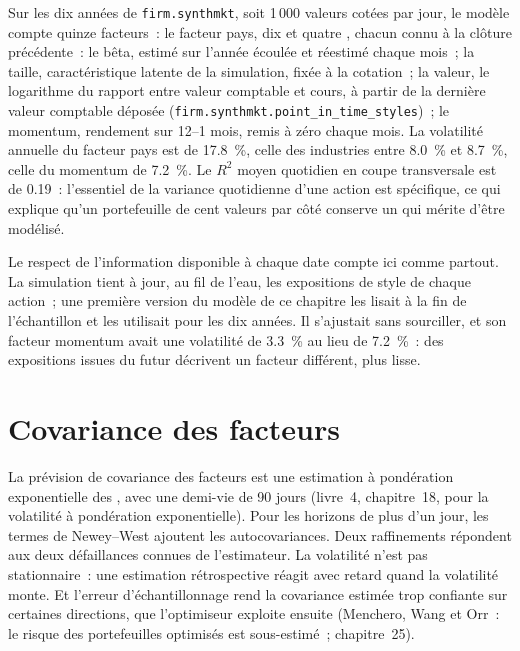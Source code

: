 Sur les dix années de \texttt{firm.synthmkt}, soit 1\,000 valeurs cotées par jour, le modèle compte quinze facteurs~: le facteur pays, dix  et quatre , chacun connu à
la clôture précédente~: le bêta, estimé sur l'année écoulée et réestimé chaque mois~; la taille, caractéristique latente de la simulation, fixée à la cotation~; la valeur,
le logarithme du rapport entre valeur comptable et cours, à partir de la dernière valeur comptable déposée (\texttt{firm.synthmkt.point\_in\_time\_styles})~; le momentum, rendement sur 12--1 mois, remis à zéro chaque
mois. La volatilité annuelle du facteur pays est de 17.8~\%, celle des industries entre 8.0~\% et 8.7~\%, celle du momentum de 7.2~\%. Le $R^2$ moyen quotidien en coupe transversale
est de 0.19~: l'essentiel de la variance quotidienne d'une action est spécifique, ce qui explique qu'un portefeuille de cent valeurs par côté conserve un  qui mérite d'être modélisé.

Le respect de l'information disponible à chaque date compte ici comme partout. La simulation tient à jour, au fil de l'eau, les expositions de style de chaque action~; une première version du modèle de ce chapitre les
lisait à la fin de l'échantillon et les utilisait pour les dix années. Il s'ajustait sans sourciller, et son facteur momentum avait une volatilité de 3.3~\% au lieu de 7.2~\%~:
des expositions issues du futur décrivent un facteur différent, plus lisse.

\section{Covariance des facteurs}

La prévision de covariance des facteurs est une estimation à pondération exponentielle des , avec une demi-vie de 90 jours (livre~4, chapitre~18, pour la
volatilité à pondération exponentielle). Pour les horizons de plus d'un jour, les termes de Newey--West ajoutent les autocovariances. Deux raffinements répondent aux deux
défaillances connues de l'estimateur. La volatilité n'est pas stationnaire~: une estimation rétrospective réagit avec retard quand la volatilité monte. Et l'erreur d'échantillonnage rend la covariance estimée trop
confiante sur certaines directions, que l'optimiseur exploite ensuite (Menchero, Wang et Orr~: le risque des portefeuilles optimisés est sous-estimé~; chapitre~25).

